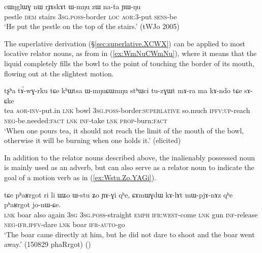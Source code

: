\begin{exe}
\ex \label{ex:rJAskAt.WmNu}
\gll  cɯŋglɯɣ nɯ rɟɤskɤt ɯ-mŋu zɯ na-ta ɲɯ-ŋu \\
 pestle \textsc{dem} stairs \textsc{3sg}.\textsc{poss}-border \textsc{loc} \textsc{aor}:3\flobv{}-put \textsc{sens}-be \\
 \glt `He put the pestle on the top of the stairs.' (tWJo 2005)
\end{exe} 

The superlative derivation (§\ref{sec:superlative.XCWX}) can be applied to most locative relator nouns, as  from   in (\ref{ex:WmNuCWmNu}), where it means that the liquid completely fills the bowl to the point of touching the border of its mouth, flowing out at the slightest motion.

\begin{exe}
\ex \label{ex:WmNuCWmNu}
\gll  tʂʰa tɤ́-wɣ-rku tɕe kʰɯtsa ɯ-mŋuɕɯmŋu stʰɯci tu-zɣɯt mɤ-ra ma kɤ-ndo tɕe sɤ-ɕke \\
tea \textsc{aor}-\textsc{inv}-put.in \textsc{lnk} bowl \textsc{3sg}.\textsc{poss}-border:\textsc{superlative} so.much \textsc{ipfv}:\textsc{up}-reach \textsc{neg}-be.needed:\textsc{fact} \textsc{lnk} \textsc{inf}-take \textsc{lnk} \textsc{prop}-burn:\textsc{fact} \\
\glt `When one pours tea, it should not reach the limit of the mouth of the bowl, otherwise it will be burning when one holds it.' (elicited)
\end{exe} 

In addition to the relator nouns described above, the inalienably possessed noun  is mainly used as an adverb, but can also serve as a relator noun to indicate the goal of a motion verb as in (\ref{ex:Wstu.Zo.YAGi}).

\begin{exe}
\ex \label{ex:Wstu.Zo.YAGi}
\gll  tɕe pʰaʁrgot ri li ɯʑo ɯ-stu ʑo ɲɤ-ɣi qʰe,  ɕɤmɯɣdɯ kɤ-lɤt mɯ-pjɤ-nɤz qʰe pʰaʁrgot jo-nɯ-ɕe. \\
\textsc{lnk} boar also again \textsc{3sg} \textsc{3sg}.\textsc{poss}-straight \textsc{emph} \textsc{ifr}:\textsc{west}-come \textsc{lnk} gun \textsc{inf}-release \textsc{neg}-\textsc{ifr}.\textsc{ipfv}-dare \textsc{lnk} boar \textsc{ifr}-\textsc{auto}-go \\
\glt `The boar came directly at him, but he did not dare to shoot and the boar went away.' (150829 phaRrgot)
()
\end{exe} 

